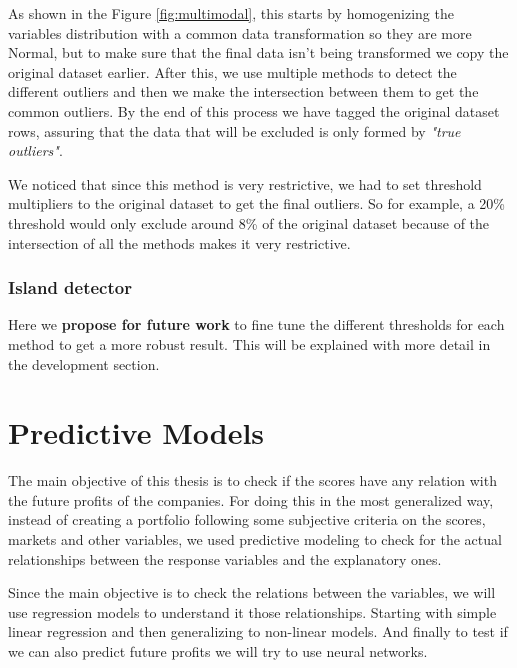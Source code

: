 \documentclass[11pt,english,a4paper,hidelinks]{book}
\begin{document}
\vspace{0.5cm}
\noindent As shown in the Figure \ref{fig:multimodal}, this starts by homogenizing the variables distribution with a common data transformation so they are more Normal, but to make sure that the final data isn't being transformed we copy the original dataset earlier. After this, we use multiple methods to detect the different outliers and then we make the intersection between them to get the common outliers. By the end of this process we have tagged the original dataset rows, assuring that the data that will be excluded is only formed by \textit{"true outliers"}.

\vspace{0.5cm}
\noindent We noticed that since this method is very restrictive, we had to set threshold multipliers to the original dataset to get the final outliers. So for example, a 20\% threshold would only exclude around 8\% of the original dataset because of the intersection of all the methods makes it very restrictive.

\subsubsection{Island detector}



Here we \textbf{propose for future work} to fine tune the different thresholds for each method to get a more robust result. This will be explained with more detail in the development section.


\section{Predictive Models}
The main objective of this thesis is to check if the scores have any relation with the future profits of the companies. For doing this in the most generalized way, instead of creating a portfolio following some subjective criteria on the scores, markets and other variables, we used predictive modeling to check for the actual relationships between the response variables and the explanatory ones.

\vspace{0.5cm}
\noindent Since the main objective is to check the relations between the variables, we will use regression models to understand it those relationships. Starting with simple linear regression and then generalizing to non-linear models. And finally to test if we can also predict future profits we will try to use neural networks.
\end{document}

